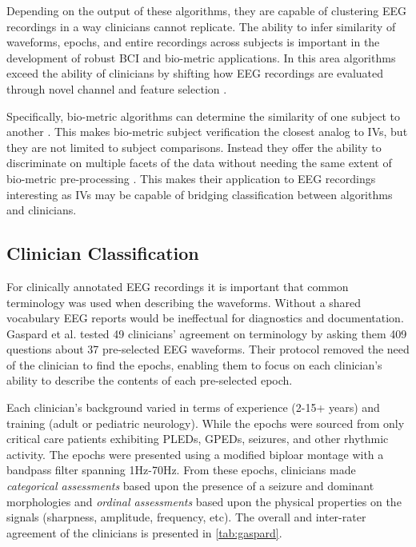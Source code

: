 Depending on the output of these algorithms, they are capable of clustering \ac{EEG} recordings in a way clinicians cannot replicate. The ability to infer similarity of waveforms, epochs, and entire recordings across subjects is important in the development of robust \ac{BCI} \cite{Lotte2010a} and bio-metric applications\cite{Campisi2014}. In this area algorithms exceed the ability of clinicians by shifting how \ac{EEG} recordings are evaluated through novel channel and feature selection \cite{Rocca2013,Brigham2010,Fraschini2015}.

Specifically, bio-metric algorithms can determine the similarity of one subject to another \cite{Campisi2014,VanBeijsterveldt2002}. This makes bio-metric subject verification the closest analog to \acp{IV}, but they are not limited to subject comparisons. Instead they offer the ability to discriminate on multiple facets of the data without needing the same extent of bio-metric pre-processing \cite{Dehak2011a}. This makes their application to \ac{EEG} recordings interesting as \acp{IV} may be capable of bridging classification between algorithms and clinicians.

\subsection{Clinician Classification}

For clinically annotated \ac{EEG} recordings it is important that common terminology was used when describing the waveforms. Without a shared vocabulary \ac{EEG} reports would be ineffectual for diagnostics and documentation\cite{Epstein2006}. Gaspard et al.\cite{Gaspard2014} tested 49 clinicians' agreement on terminology by asking them 409 questions about 37 pre-selected \ac{EEG} waveforms. Their protocol removed the need of the clinician to find the epochs, enabling them to focus on each clinician's ability to describe the contents of each pre-selected epoch.

Each clinician's background varied in terms of experience (2-15+ years) and training (adult or pediatric neurology). While the epochs were sourced from only critical care patients exhibiting \acp{PLED}, \acp{GPED}, seizures, and other rhythmic activity. The epochs were presented using a modified biploar montage with a bandpass filter spanning 1Hz-70Hz. From these epochs, clinicians made \emph{categorical assessments} based upon the presence of a seizure and dominant morphologies and \emph{ordinal assessments} based upon the physical properties on the signals (sharpness, amplitude, frequency, etc). The overall and inter-rater agreement of the clinicians is presented in \cref{tab:gaspard}.

